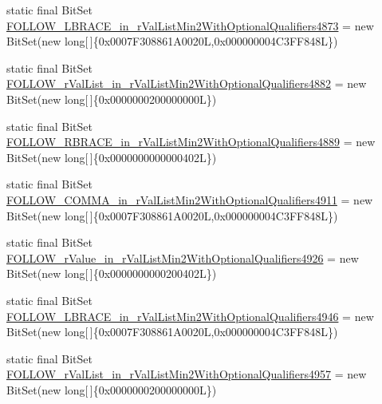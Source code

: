 \begin{DoxyCompactItemize}
\item 
static final Bit\-Set \hyperlink{classorg_1_1tzi_1_1use_1_1parser_1_1shell_1_1_shell_command_parser_a49661eae092e41311ca29db91b6f0785}{F\-O\-L\-L\-O\-W\-\_\-\-L\-B\-R\-A\-C\-E\-\_\-in\-\_\-r\-Val\-List\-Min2\-With\-Optional\-Qualifiers4873} = new Bit\-Set(new long\mbox{[}$\,$\mbox{]}\{0x0007\-F308861\-A0020\-L,0x000000004\-C3\-F\-F848\-L\})
\item 
static final Bit\-Set \hyperlink{classorg_1_1tzi_1_1use_1_1parser_1_1shell_1_1_shell_command_parser_adcb87519754fca16529b7334d587d3bf}{F\-O\-L\-L\-O\-W\-\_\-r\-Val\-List\-\_\-in\-\_\-r\-Val\-List\-Min2\-With\-Optional\-Qualifiers4882} = new Bit\-Set(new long\mbox{[}$\,$\mbox{]}\{0x0000000200000000\-L\})
\item 
static final Bit\-Set \hyperlink{classorg_1_1tzi_1_1use_1_1parser_1_1shell_1_1_shell_command_parser_a3edbc3d88705481560e3171d4c07c732}{F\-O\-L\-L\-O\-W\-\_\-\-R\-B\-R\-A\-C\-E\-\_\-in\-\_\-r\-Val\-List\-Min2\-With\-Optional\-Qualifiers4889} = new Bit\-Set(new long\mbox{[}$\,$\mbox{]}\{0x0000000000000402\-L\})
\item 
static final Bit\-Set \hyperlink{classorg_1_1tzi_1_1use_1_1parser_1_1shell_1_1_shell_command_parser_a1cbf2a5a6bdd94c196509389a5ca78ee}{F\-O\-L\-L\-O\-W\-\_\-\-C\-O\-M\-M\-A\-\_\-in\-\_\-r\-Val\-List\-Min2\-With\-Optional\-Qualifiers4911} = new Bit\-Set(new long\mbox{[}$\,$\mbox{]}\{0x0007\-F308861\-A0020\-L,0x000000004\-C3\-F\-F848\-L\})
\item 
static final Bit\-Set \hyperlink{classorg_1_1tzi_1_1use_1_1parser_1_1shell_1_1_shell_command_parser_a905e4e7a970699432c1f0835055ea20e}{F\-O\-L\-L\-O\-W\-\_\-r\-Value\-\_\-in\-\_\-r\-Val\-List\-Min2\-With\-Optional\-Qualifiers4926} = new Bit\-Set(new long\mbox{[}$\,$\mbox{]}\{0x0000000000200402\-L\})
\item 
static final Bit\-Set \hyperlink{classorg_1_1tzi_1_1use_1_1parser_1_1shell_1_1_shell_command_parser_a90bdc3d5e3b0fc14f0f8fd89913d174c}{F\-O\-L\-L\-O\-W\-\_\-\-L\-B\-R\-A\-C\-E\-\_\-in\-\_\-r\-Val\-List\-Min2\-With\-Optional\-Qualifiers4946} = new Bit\-Set(new long\mbox{[}$\,$\mbox{]}\{0x0007\-F308861\-A0020\-L,0x000000004\-C3\-F\-F848\-L\})
\item 
static final Bit\-Set \hyperlink{classorg_1_1tzi_1_1use_1_1parser_1_1shell_1_1_shell_command_parser_ad257406022ef460b906fea5ba7a03f65}{F\-O\-L\-L\-O\-W\-\_\-r\-Val\-List\-\_\-in\-\_\-r\-Val\-List\-Min2\-With\-Optional\-Qualifiers4957} = new Bit\-Set(new long\mbox{[}$\,$\mbox{]}\{0x0000000200000000\-L\})
\item 

\end{DoxyCompactItemize}
